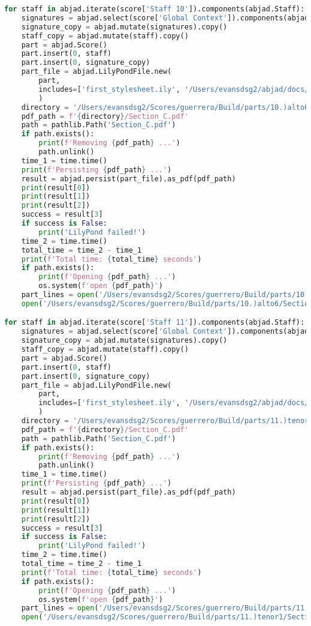 \begin{lstlisting}[language=Python, caption=Invocation Source Code]
for staff in abjad.iterate(score['Staff 10']).components(abjad.Staff):
    signatures = abjad.select(score['Global Context']).components(abjad.Staff)
    signature_copy = abjad.mutate(signatures).copy()
    staff_copy = abjad.mutate(staff).copy()
    part = abjad.Score()
    part.insert(0, staff)
    part.insert(0, signature_copy)
    part_file = abjad.LilyPondFile.new(
        part,
        includes=['first_stylesheet.ily', '/Users/evansdsg2/abjad/docs/source/_stylesheets/abjad.ily'],
        )
    directory = '/Users/evansdsg2/Scores/guerrero/Build/parts/10.)alto6'
    pdf_path = f'{directory}/Section_C.pdf'
    path = pathlib.Path('Section_C.pdf')
    if path.exists():
        print(f'Removing {pdf_path} ...')
        path.unlink()
    time_1 = time.time()
    print(f'Persisting {pdf_path} ...')
    result = abjad.persist(part_file).as_pdf(pdf_path)
    print(result[0])
    print(result[1])
    print(result[2])
    success = result[3]
    if success is False:
        print('LilyPond failed!')
    time_2 = time.time()
    total_time = time_2 - time_1
    print(f'Total time: {total_time} seconds')
    if path.exists():
        print(f'Opening {pdf_path} ...')
        os.system(f'open {pdf_path}')
    part_lines = open('/Users/evansdsg2/Scores/guerrero/Build/parts/10.)alto6/Section_C.ly').readlines()
    open('/Users/evansdsg2/Scores/guerrero/Build/parts/10.)alto6/Section_C.ly', 'w').writelines(part_lines[15:-1])

for staff in abjad.iterate(score['Staff 11']).components(abjad.Staff):
    signatures = abjad.select(score['Global Context']).components(abjad.Staff)
    signature_copy = abjad.mutate(signatures).copy()
    staff_copy = abjad.mutate(staff).copy()
    part = abjad.Score()
    part.insert(0, staff)
    part.insert(0, signature_copy)
    part_file = abjad.LilyPondFile.new(
        part,
        includes=['first_stylesheet.ily', '/Users/evansdsg2/abjad/docs/source/_stylesheets/abjad.ily'],
        )
    directory = '/Users/evansdsg2/Scores/guerrero/Build/parts/11.)tenor1'
    pdf_path = f'{directory}/Section_C.pdf'
    path = pathlib.Path('Section_C.pdf')
    if path.exists():
        print(f'Removing {pdf_path} ...')
        path.unlink()
    time_1 = time.time()
    print(f'Persisting {pdf_path} ...')
    result = abjad.persist(part_file).as_pdf(pdf_path)
    print(result[0])
    print(result[1])
    print(result[2])
    success = result[3]
    if success is False:
        print('LilyPond failed!')
    time_2 = time.time()
    total_time = time_2 - time_1
    print(f'Total time: {total_time} seconds')
    if path.exists():
        print(f'Opening {pdf_path} ...')
        os.system(f'open {pdf_path}')
    part_lines = open('/Users/evansdsg2/Scores/guerrero/Build/parts/11.)tenor1/Section_C.ly').readlines()
    open('/Users/evansdsg2/Scores/guerrero/Build/parts/11.)tenor1/Section_C.ly', 'w').writelines(part_lines[15:-1])


\end{lstlisting}
